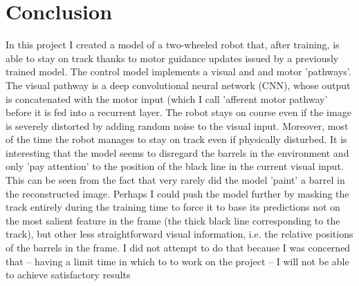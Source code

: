 \documentclass[11pt, oneside]{article}   	%
\begin{document}
\section{Conclusion}
In this project I created a model of a two-wheeled robot that, after training, is able to stay on track thanks to motor guidance updates issued by a previously trained model. The control model implements a visual and and motor 'pathways'. The visual pathway is a deep convolutional neural network (CNN), whose output is concatenated with the motor input (which I call 'afferent motor pathway' before it is fed into a recurrent layer. The robot stays on course even if the image is severely distorted by adding random noise to the visual input. Moreover, most of the time the robot manages to stay on track even if physically disturbed. It is interesting that the model seems to disregard the barrels in the environment and only 'pay attention' to the position of the black line in the current visual input. This can be seen from the fact that very rarely did the model 'paint' a barrel in the reconstructed image. Perhaps I could push the model further by masking the track entirely during the training time to force it to base its predictions not on the most salient feature in the frame (the thick black line corresponding to the track), but other less straightforward visual information, i.e. the relative positions of the barrels in the frame. I did not attempt to do that because I was concerned that -- having a limit time in which to to work on the project -- I will not be able to achieve satisfactory results



\end{document}
